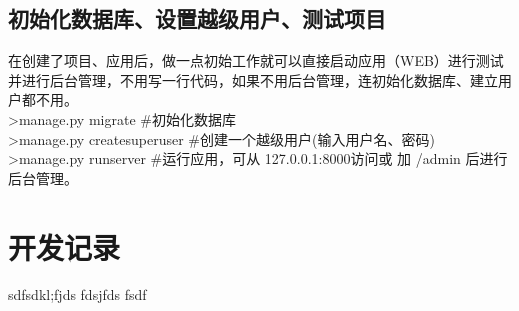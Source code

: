 \documentclass[a4paper]{ctexart}
\begin{document}
    \subsection{初始化数据库、设置越级用户、测试项目}
    在创建了项目、应用后，做一点初始工作就可以直接启动应用（WEB）进行测试并进行后台管理，不用写一行代码，如果不用后台管理，连初始化数据库、建立用户都不用。\\
      \indent >manage.py migrate  \#初始化数据库 \\
      \indent >manage.py createsuperuser \#创建一个越级用户(输入用户名、密码)\\
      \indent >manage.py runserver \#运行应用，可从 127.0.0.1:8000访问或 加 /admin 后进行后台管理。
  \newpage
  \section{开发记录}
  sdfsdkl;fjds
  fdsjfds
  fsdf
    \subsection{}
          
  
    
  
\end{document}
